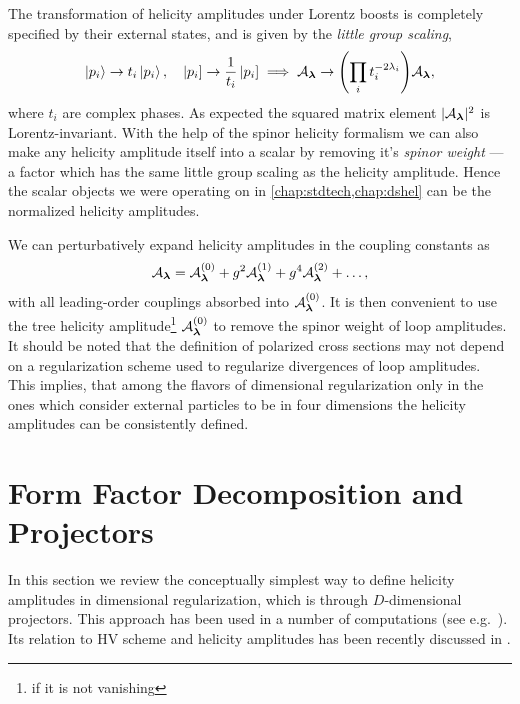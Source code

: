 The transformation of helicity amplitudes under Lorentz boosts is completely specified by their 
external states, and is given by the \emph{little group scaling},
\begin{equation}
  \ket{p_i} \to t_i \ket{p_i}, \quad  \left\vert p_i \right] \to \frac{1}{t_i} \left\vert p_i \right] \implies \mathcal{A}_{\vb*{\lambda}} \to  \qty(\prod_i t_i^{-2\lambda_i}) \mathcal{A}_{\vb*{\lambda}},
\end{equation}
where $t_i$ are complex phases.
As expected the squared matrix element $\vert \mathcal{A}_{\vb*{\lambda}}{} \vert^2$ is Lorentz-invariant.
With the help of the spinor helicity formalism we can also make any helicity amplitude itself into a scalar
by removing it's \emph{spinor weight} --- a factor which has the same little group scaling
as the helicity amplitude.
Hence the scalar objects we were operating on in \cref{chap:stdtech,chap:dshel} can be the normalized helicity amplitudes.

We can perturbatively expand helicity amplitudes in the coupling constants as
\begin{equation}
  \mathcal{A}_{\vb*{\lambda}} =  \mathcal{A}_{\vb*{\lambda}}^{(0)} + g^2 \mathcal{A}_{\vb*{\lambda}}^{(1)} + g^4 \mathcal{A}_{\vb*{\lambda}}^{(2)} + \ldots{},
\end{equation}
with all leading-order couplings absorbed into $\mathcal{A}_{\vb*{\lambda}}^{(0)}$.
It is then convenient to use the tree helicity amplitude\footnote{if it is not vanishing} $\mathcal{A}_{\vb*{\lambda}} ^{(0)}$ to remove the spinor weight
of loop amplitudes.
It should be noted that the definition of polarized cross sections may not depend on a regularization scheme
used to regularize divergences of loop amplitudes. This implies, that 
among the flavors of dimensional regularization only in the ones which consider external particles 
to be in four dimensions the helicity amplitudes can be consistently defined.


\section{Form Factor Decomposition and Projectors}
\label{sec:helampl_projectors}

In this section we review the conceptually simplest way to define helicity amplitudes in dimensional regularization, which is through $D$-dimensional projectors.
This approach has been used in a number of computations (see e.g.\ \cite{Garland:2002ak, Moch:2002hm, Glover:2003cm, Glover:2004si,Gehrmann:2009vu,Gehrmann:2011aa}).
Its relation to HV scheme and helicity amplitudes has been recently discussed in \cite{Peraro:2019cjj}.

